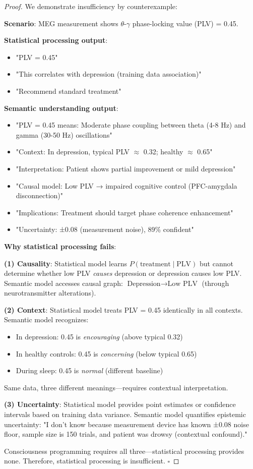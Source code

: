 \begin{proof}
We demonstrate insufficiency by counterexample:

\textbf{Scenario}: MEG measurement shows $\theta$-$\gamma$ phase-locking value (PLV) = 0.45.

\textbf{Statistical processing output}:
\begin{itemize}
\item "PLV = 0.45"
\item "This correlates with depression (training data association)"
\item "Recommend standard treatment"
\end{itemize}

\textbf{Semantic understanding output}:
\begin{itemize}
\item "PLV = 0.45 means: Moderate phase coupling between theta (4-8 Hz) and gamma (30-50 Hz) oscillations"
\item "Context: In depression, typical PLV $\approx$ 0.32; healthy $\approx$ 0.65"
\item "Interpretation: Patient shows partial improvement or mild depression"
\item "Causal model: Low PLV → impaired cognitive control (PFC-amygdala disconnection)"
\item "Implications: Treatment should target phase coherence enhancement"
\item "Uncertainty: ±0.08 (measurement noise), 89\% confident"
\end{itemize}

\textbf{Why statistical processing fails}:

\textbf{(1) Causality}: Statistical model learns $P(\text{treatment} \mid \text{PLV})$ but cannot determine whether low PLV \textit{causes} depression or depression causes low PLV. Semantic model accesses causal graph: $\text{Depression} \to \text{Low PLV}$ (through neurotransmitter alterations).

\textbf{(2) Context}: Statistical model treats PLV = 0.45 identically in all contexts. Semantic model recognizes:
\begin{itemize}
\item In depression: 0.45 is \textit{encouraging} (above typical 0.32)
\item In healthy controls: 0.45 is \textit{concerning} (below typical 0.65)
\item During sleep: 0.45 is \textit{normal} (different baseline)
\end{itemize}

Same data, three different meanings—requires contextual interpretation.

\textbf{(3) Uncertainty}: Statistical model provides point estimates or confidence intervals based on training data variance. Semantic model quantifies epistemic uncertainty: "I don't know because measurement device has known ±0.08 noise floor, sample size is 150 trials, and patient was drowsy (contextual confound)."

Consciousness programming requires all three—statistical processing provides none. Therefore, statistical processing is insufficient. $\square$
\end{proof}

